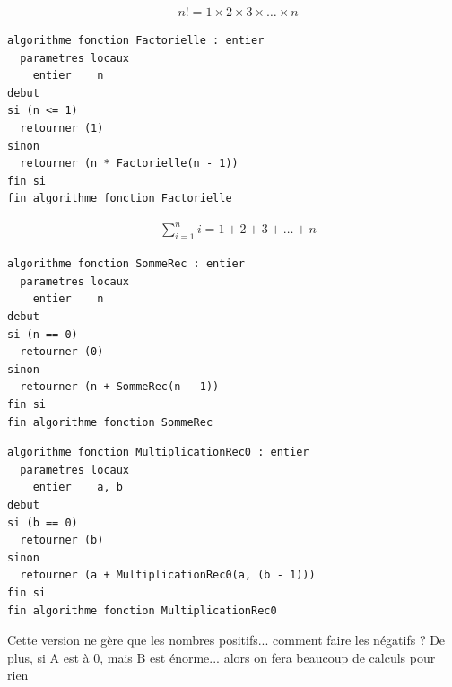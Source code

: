 \documentclass[11pt,a4paper]{article}
\begin{document}
\bigskip


\begin{equation*}
  \begin{aligned}
& n! = 1 \times 2 \times 3 \times \ldots \times n
  \end{aligned}
\end{equation*}


\begin{table}[ht!]
  \centering
\begin{lstlisting}[style=algorithmique]
algorithme fonction Factorielle : entier
  parametres locaux
    entier    n
debut
si (n <= 1)
  retourner (1)
sinon
  retourner (n * Factorielle(n - 1))
fin si
fin algorithme fonction Factorielle \end{lstlisting}
\end{table}


\bigskip


\begin{equation*}
  \begin{aligned}
& \sum^{n}_{i = 1} i = 1 + 2 + 3 + \ldots + n
  \end{aligned}
\end{equation*}

\begin{table}[ht!]
  \centering
\begin{lstlisting}[style=algorithmique]
algorithme fonction SommeRec : entier
  parametres locaux
    entier    n
debut
si (n == 0)
  retourner (0)
sinon
  retourner (n + SommeRec(n - 1))
fin si
fin algorithme fonction SommeRec \end{lstlisting}
\end{table}

\bigskip

\newpage


\begin{table}[ht!]
  \centering
\begin{lstlisting}[style=algorithmique]
algorithme fonction MultiplicationRec0 : entier
  parametres locaux
    entier    a, b
debut
si (b == 0)
  retourner (b)
sinon
  retourner (a + MultiplicationRec0(a, (b - 1)))
fin si
fin algorithme fonction MultiplicationRec0 \end{lstlisting}
  \caption{Cette version ne gère que les nombres positifs... comment faire les négatifs ? De plus, si A est à 0, mais B est énorme... alors on fera beaucoup de calculs pour rien}
\end{table}
\end{document}

